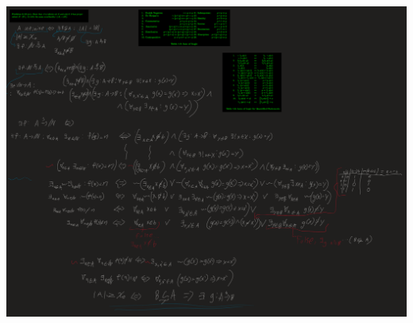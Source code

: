 \documentclass[]{article}
\begin{document}
\includegraphics[width=\textwidth]{MidExam1_pblm6.png}
\end{document}
